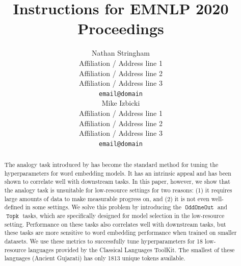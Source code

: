 \documentclass[11pt,a4paper]{article}
\title{Instructions for EMNLP 2020 Proceedings}
\author{Nathan Stringham\\
  Affiliation / Address line 1 \\
  Affiliation / Address line 2 \\
  Affiliation / Address line 3 \\
  \texttt{email@domain} \\\And
  Mike Izbicki \\
  Affiliation / Address line 1 \\
  Affiliation / Address line 2 \\
  Affiliation / Address line 3 \\
  \texttt{email@domain} \\}
\date{}
\DeclareMathOperator{\OddOneOut}{\texttt{OddOneOut}}
\DeclareMathOperator{\topk}{\texttt{Topk}}
\begin{document}
\maketitle
\begin{abstract}
    The analogy task introduced by \citet{mikolov2013efficient} has become the standard method for tuning the hyperparameters for word embedding models.
    It has an intrinsic appeal and has been shown to correlate well with downstream tasks.
    In this paper, however, we show that the analogy task is unsuitable for low-resource settings for two reasons: (1) it requires large amounts of data to make measurable progress on,
    and (2) it is not even well-defined in some settings.
    We solve this problem by introducing the $\OddOneOut$ and $\topk$ tasks,
    which are specifically designed for model selection in the low-resource setting.
    Performance on these tasks also correlates well with downstream tasks,
    but these tasks are more sensitive to word embedding performance when trained on smaller datasets.
    We use these metrics to successfully tune hyperparameters for 18 low-resource languages provided by the Classical Languages ToolKit.    
    The smallest of these languages (Ancient Gujarati) has only 1813 unique tokens available.


\end{abstract}
\end{document}
